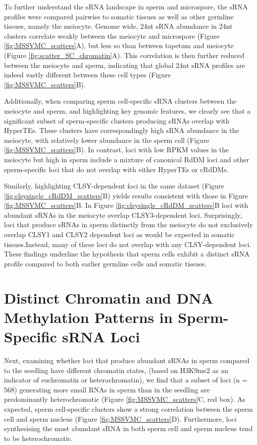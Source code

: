 To further understand the sRNA landscape in sperm and microspore, the sRNA profiles were compared pairwise to somatic tissues as well as other germline tissues, namely the meiocyte. Genome wide, 24nt sRNA abundance in 24nt clusters correlate weakly between the meiocyte and microspore (Figure \ref{fig:MSSVMC_scatters}A), but less so than between tapetum and meiocyte (Figure \ref{fig:scatter_SC_chromatin}A). This correlation is then further reduced between the meiocyte and sperm, indicating that global 24nt sRNA profiles are indeed vastly different between these cell types (Figure \ref{fig:MSSVMC_scatters}B).

Additionally, when comparing sperm cell-specific sRNA clusters between the meiocyte and sperm, and highlighting key genomic features, we clearly see that a significant subset of sperm-specific clusters producing sRNAs overlap with HyperTEs. These clusters have correspondingly high sRNA abundance in the meiocyte, with relatively lower abundance in the sperm cell (Figure \ref{fig:MSSVMC_scatters}B). In contrast, loci with low RPKM values in the meiocyte but high in sperm include a mixture of canonical RdDM loci and other sperm-specific loci that do not overlap with either HyperTEs or cRdDMs.

Similarly, highlighting CLSY-dependent loci in the same dataset (Figure \ref{fig:clsysingle_cRdDM_scatters}B) yields results consistent with those in Figure \ref{fig:MSSVMC_scatters}B. In Figure \ref{fig:clsysingle_cRdDM_scatters}B loci with abundant sRNAs in the meiocyte overlap CLSY3-dependent loci. Surprisingly, loci that produce sRNAs in sperm distinctly from the meiocyte do not exclusively overlap CLSY1 and CLSY2 dependent loci as would be expected in somatic tissues.Instead, many of these loci do not overlap with any CLSY-dependent loci. These findings underline the hypothesis that sperm cells exhibit a distinct sRNA profile compared to both earlier germline cells and somatic tissues.

\section{Distinct Chromatin and DNA Methylation Patterns in Sperm-Specific sRNA Loci}

Next, examining whether loci that produce abundant sRNAs in sperm compared to the seedling have different chromatin states, (based on H3K9me2 as an indicator of euchromatin or heterochromatin), we find that a subset of loci (n = 568) generating more small RNAs in sperm than in the seedling are predominantly heterochromatic (Figure \ref{fig:MSSVMC_scatters}C, red box). As expected, sperm cell-specific clusters show a strong correlation between the sperm cell and sperm nucleus (Figure \ref{fig:MSSVMC_scatters}D). Furthermore, loci synthesising the most abundant sRNA in both sperm cell and sperm nucleus tend to be heterochromatic.

